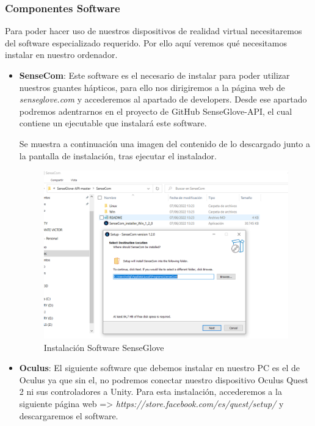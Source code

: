 \subsubsection{Componentes Software}
Para poder hacer uso de nuestros dispositivos de realidad virtual necesitaremos del software especializado requerido. Por ello aquí veremos qué necesitamos instalar en nuestro ordenador.
\begin{itemize}
    \item \textbf{SenseCom}:
    Este software es el necesario de instalar para poder utilizar nuestros guantes hápticos, para ello nos dirigiremos a la página web de \textit{senseglove.com} y accederemos al apartado de developers. Desde ese apartado podremos adentrarnos en el proyecto de GitHub SenseGlove-API, el cual contiene un ejecutable que instalará este software.
    
    Se muestra a continuación una imagen del contenido de lo descargado junto a la pantalla de instalación, tras ejecutar el instalador.
    
    \begin{figure}[h]
\centering
\label{Instalación Software SenseGlove}
\includegraphics[width=1.1\textwidth]{img/sensecom01.PNG}
\caption{Instalación Software SenseGlove}
\end{figure}

\newpage
\item \textbf{Oculus}:
El siguiente software que debemos instalar en nuestro PC es el de Oculus\cite{Quest2} ya que sin el, no podremos conectar nuestro dispositivo Oculus Quest 2 ni sus controladores a Unity. 
Para esta instalación, accederemos a la siguiente página web => \textit{https://store.facebook.com/es/quest/setup/} y descargaremos el software.


\end{itemize}
